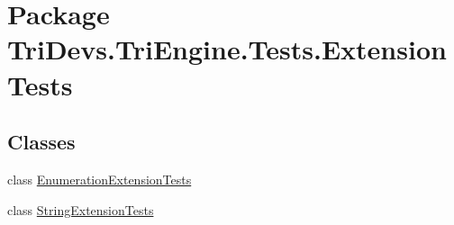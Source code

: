\hypertarget{namespace_tri_devs_1_1_tri_engine_1_1_tests_1_1_extension_tests}{\section{Package Tri\-Devs.\-Tri\-Engine.\-Tests.\-Extension\-Tests}
\label{namespace_tri_devs_1_1_tri_engine_1_1_tests_1_1_extension_tests}
}
\subsection*{Classes}
\begin{DoxyCompactItemize}
\item 
class \hyperlink{class_tri_devs_1_1_tri_engine_1_1_tests_1_1_extension_tests_1_1_enumeration_extension_tests}{Enumeration\-Extension\-Tests}
\item 
class \hyperlink{class_tri_devs_1_1_tri_engine_1_1_tests_1_1_extension_tests_1_1_string_extension_tests}{String\-Extension\-Tests}
\end{DoxyCompactItemize}
